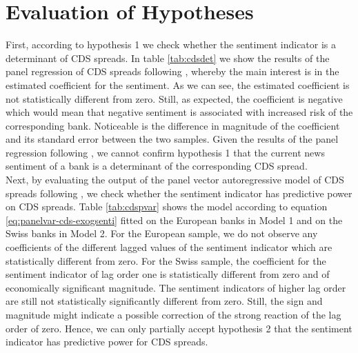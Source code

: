 \section{Evaluation of Hypotheses} \label{sec:results}

First, according to hypothesis 1 we check whether the sentiment indicator is a determinant of CDS spreads. In table \ref{tab:cdsdet} we show the results of the panel regression of CDS spreads following \cite{annaert2013}, whereby the main interest is in the estimated coefficient for the sentiment. As we can see, the estimated coefficient is not statistically different from zero. Still, as expected, the coefficient is negative which would mean that negative sentiment is associated with increased risk of the corresponding bank. Noticeable is the difference in magnitude of the coefficient and its standard error between the two samples. Given the results of the panel regression following \cite{annaert2013}, we cannot confirm hypothesis 1 that the current news sentiment of a bank is a determinant of the corresponding CDS spread. \\



Next, by evaluating the output of the panel vector autoregressive model of CDS spreads following \cite{cathcart2020}, we check whether the sentiment indicator has predictive power on CDS spreads. Table \ref{tab:cdspvar} shows the model according to equation \ref{eq:panelvar-cds-exogsenti} fitted on the European banks in Model 1 and on the Swiss banks in Model 2. For the European sample, we do not observe any coefficients of the different lagged values of the sentiment indicator which are statistically different from zero. For the Swiss sample, the coefficient for the sentiment indicator of lag order one is statistically different from zero and of economically significant magnitude. The sentiment indicators of higher lag order are still not statistically significantly different from zero. Still, the sign and magnitude might indicate a possible correction of the strong reaction of the lag order of zero. Hence, we can only partially accept hypothesis 2 that the sentiment indicator has predictive power for CDS spreads. \\



